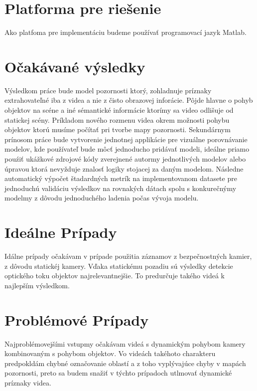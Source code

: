 \section{Platforma pre riešenie}
Ako platfoma pre implementáciu budeme používať programovací jazyk Matlab.
\section{Očakávané výsledky}
Výsledkom práce bude model pozornosti ktorý, zohladnuje príznaky extrahovateľné iba z videa a nie z čisto obrazovej inforácie.
Pôjde hlavne o pohyb objektov na scéne a iné sémantické informácie ktorímy sa video odlišuje od statickej scény.
Príkladom nového rozmenu videa okrem možnosti pohybu objektov ktorú musíme počítať pri tvorbe mapy pozornosti.
Sekundárnym prínosom práce bude vytvorenie jednotnej applikácie pre vizuálne porovnávanie modelov, kde používateľ bude môcť jednoducho pridávať modeli, ideálne priamo pouźiť ukážkové zdrojové kódy zverejnené autormy jednotlivých modelov alebo úpravou ktorá nevyžduje znalosť logiky stojacej za daným modelom.
Následne automatický výpočet štadardných metrík na implementovanom datasete pre jednoduchú validáciu výsledkov na rovnakých dátach spolu s konkurečnýmy modelmy z dôvodu jednoduchého ladenia počas vývoja modelu.
\section{Ideálne Prípady}
Idálne prípady očakávam v prípade použitia záznamov z bezpečnostných kamier, z dôvodu statickéj kamery.
Vďaka statickému pozadiu sú výsledky detekcie optického toku objektov najrelevantnejšie.
To predurčuje takého videá k najlepším výsledkom.
\section{Problémové Prípady}
Najproblémovejšími vstupmy očakávam videá s dynamickým pohybom kamery kombinovaným s pohybom objektov.
Vo videách takéhoto charakteru predpokldám chybné označovanie oblastí a z toho vyplývajúce chyby v mapách pozornosti, preto sa budem snažiť v týchto prípadoch utlmovať dynamické príznaky videa.
